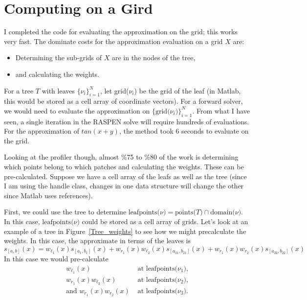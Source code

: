 \documentclass{article}
\begin{document}
\section{Computing on a Gird}
I completed the code for evaluating the approximation on the grid; this works very fast. The dominate costs for the approximation evaluation on a grid $X$ are:
\begin{itemize}
\item Determining the sub-grids of $X$ are in the nodes of the tree,
\item and calculating the weights.
\end{itemize}
For a tree $T$ with leaves $\{\nu_i\}_{i=1}^N$, let grid($\nu_i$) be the grid of the leaf (in Matlab, this would be stored as a cell array of coordinate vectors). For a forward solver, we would need to evaluate the approximation on $\{\text{grid($\nu_i$)}\}_{i=1}^N$. From what I have seen, a single iteration in the RASPEN solve will require hundreds of evaluations. For the approximation of $tan(x+y)$, the method took 6 seconds to evaluate on the grid.

Looking at the profiler though, almost \%75 to \%80 of the work is determining which points belong to which patches and calculating the weights. These can be pre-calculated. Suppose we have a cell array of the leafs as well as the tree (since I am using the handle class, changes in one data structure will change the other since Matlab uses references).

First, we could use the tree to determine $\text{leafpoints($\nu$)}=\text{points($T$)}\cap\text{domain($\nu$)}$. In this case, $\text{leafpoints($\nu$)}$ could be stored as a cell array of grids. Let's look at an example of a tree in Figure~\ref{Tree_weights} to see how we might precalculate the weights. In this case, the approximate in terms of the leaves is
\begin{equation}
s_{[a,b]}(x) =  w_{\ell_1}(x) s_{[a_{1},b_{1}]}(x) +  w_{r_1}(x)  w_{\ell_2}(x) s_{[a_{21},b_{21}]}(x) + w_{r_1}(x) w_{r_2}(x) s_{[a_{22},b_{22}]}(x)
\end{equation}
In this case we would pre-calculate
\begin{equation}
\begin{aligned}
w_{\ell_1}(x) &\text{ at leafpoints($\nu_1$),} \\
w_{r_1}(x)  w_{\ell_2}(x) &\text{ at leafpoints($\nu_2$),} \\
\text{and } w_{r_1}(x) w_{r_2}(x)  &\text{ at leafpoints($\nu_3$).}
\end{aligned}
\end{equation}
\end{document}
